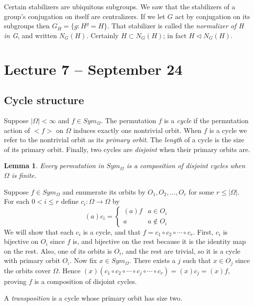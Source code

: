 \documentclass[letterpaper]{article}
\newtheorem{lemma}[theorem]{Lemma}
\newenvironment{proof}[1][Proof]{\begin{trivlist}
\item[\hskip \labelsep {\bfseries #1}]}{\end{trivlist}}
\begin{document}
Certain stabilizers are ubiquitous subgroups. We saw that the
stabilizers of a group's conjugation on itself are centralizers.
If we let $G$ act by conjugation on its subgroups then $G_H =
\{g\colon H^g = H\}$. That stabilizer is called the \emph{normalizer
of H in G}, and written $N_G(H)$. Certainly $H \subset N_G(H)$; in
fact $H \lhd N_G(H)$.

\section{Lecture 7 -- September 24}

\subsection{Cycle structure}

Suppose $|\Omega| < \infty$ and $f \in Sym_\Omega$. The permutation
$f$ is a \emph{cycle} if the permutation action of ${<}f{>}$ on
$\Omega$ induces exactly one nontrivial orbit. When $f$ is a cycle
we refer to the nontrivial orbit as its \emph{primary orbit}. The
\emph{length} of a cycle is the size of its primary orbit. Finally,
two cycles are \emph{disjoint} when their primary orbits are.

\begin{lemma}
Every permutation in $Sym_\Omega$ is a composition of disjoint
cycles when $\Omega$ is finite.
\end{lemma}
\begin{proof}
Suppose $f \in Sym_\Omega$ and enumerate its orbits by $O_1, O_2,
\ldots, O_r$ for some $r \leq |\Omega|$. For each $0 < i \leq r$
define $c_i \colon \Omega \rightarrow \Omega$ by
\[(a)c_i = \begin{cases}
(a)f & a \in O_i \\
a & a \not \in O_i
\end{cases}
\]
We will show that each $c_i$ is a cycle, and that $f = c_1 \circ
c_2 \circ \cdots \circ c_r$. First, $c_i$ is bijective on $O_i$
since $f$ is, and bijective on the rest because it is the identity
map on the rest. Also, one of its orbits is $O_i$, and the rest are
trivial, so it is a cycle with primary orbit $O_i$. Now fix $x \in
Sym_\Omega$. There exists a $j$ such that $x \in O_j$ since the
orbits cover $\Omega$. Hence $(x)(c_1 \circ c_2 \circ \cdots \circ
c_j \circ \cdots \circ c_r) = (x)c_j = (x)f$, proving $f$ is a
composition of disjoint cycles.
\end{proof}

A \emph{transposition} is a cycle whose primary orbit has size two.
\end{document}
